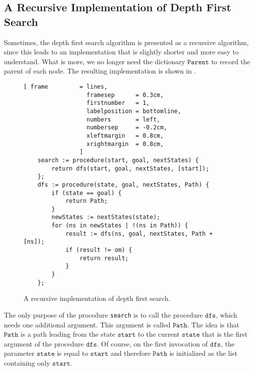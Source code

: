 \subsection{A Recursive Implementation of Depth First Search}
Sometimes, the depth first search algorithm is presented as a recursive algorithm, since this leads
to an implementation that is slightly shorter and more easy to understand.  What is more, we no
longer need the dictionary $\mathtt{Parent}$ to record the parent of each node.  The resulting
implementation is shown in .

\begin{figure}[!ht]
\centering
\begin{Verbatim}[ frame         = lines, 
                  framesep      = 0.3cm, 
                  firstnumber   = 1,
                  labelposition = bottomline,
                  numbers       = left,
                  numbersep     = -0.2cm,
                  xleftmargin   = 0.8cm,
                  xrightmargin  = 0.8cm,
                ]
    search := procedure(start, goal, nextStates) {
        return dfs(start, goal, nextStates, [start]);
    };    
    dfs := procedure(state, goal, nextStates, Path) {
        if (state == goal) {
            return Path;
        }
        newStates := nextStates(state);
        for (ns in newStates | !(ns in Path)) {
            result := dfs(ns, goal, nextStates, Path + [ns]);
            if (result != om) {
                return result;
            }   
        }
    };
\end{Verbatim}
\vspace*{-0.3cm}
\caption{A recursive implementation of depth first search.}
\label{fig:depth-first-search-recursive.stlx}
\end{figure}
The only purpose of the procedure \texttt{search} is to call the procedure $\mathtt{dfs}$, which needs one
additional argument.  This argument is called $\mathtt{Path}$.  The idea is that $\mathtt{Path}$ is
a path leading from the state $\mathtt{start}$ to the current $\mathtt{state}$ that is the first
argument of the procedure $\mathtt{dfs}$.  Of course, on the first invocation of $\mathtt{dfs}$, the
parameter $\mathtt{state}$ is equal to $\mathtt{start}$ and therefore $\mathtt{Path}$ is initialized
as the list containing only $\mathtt{start}$.

